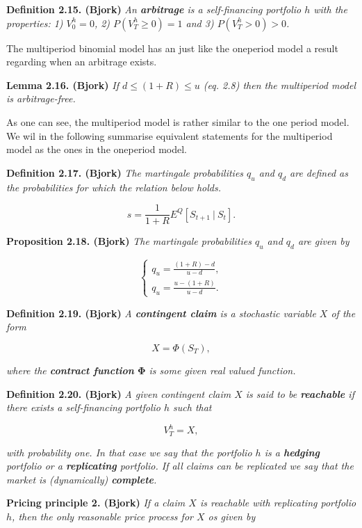 \documentclass[a4paper,12pt,openany]{book}
\begin{document}
\textbf{Definition 2.15. (Bjork)} \emph{An \textbf{arbitrage} is a self-financing portfolio \(h\) with the properties: 1) \(V^h_0=0\), 2) \(P(V^h_T\ge 0)=1\) and 3) \(P(V^h_T>0)>0\).}

The multiperiod binomial model has an just like the oneperiod model a result regarding when an arbitrage exists.

\textbf{Lemma 2.16. (Bjork)} \emph{If \(d\le (1+R)\le u\) (eq. 2.8) then the multiperiod model is arbitrage-free.}

As one can see, the multiperiod model is rather similar to the one period model. We wil in the following summarise equivalent statements for the multiperiod model as the ones in the oneperiod model.

\textbf{Definition 2.17. (Bjork)} \emph{The martingale probabilities \(q_u\) and \(q_d\) are defined as the probabilities for which the relation below holds.}

\[
s=\frac{1}{1+R}E^Q[S_{t+1}\ \vert\ S_t].
\]

\textbf{Proposition 2.18. (Bjork)} \emph{The martingale probabilities \(q_u\) and \(q_d\) are given by}

\[
\left\{\begin{matrix}q_u=\frac{(1+R)-d}{u-d},\\ q_u=\frac{u-(1+R)}{u-d}.\end{matrix}\right.
\]

\textbf{Definition 2.19. (Bjork)} \emph{A \textbf{contingent claim} is a stochastic variable \(X\) of the form}

\[
X=\Phi(S_T),
\]

\emph{where the \textbf{contract function} \(\mathbf{\Phi}\) is some given real valued function.}

\textbf{Definition 2.20. (Bjork)} \emph{A given contingent claim \(X\) is said to be \textbf{reachable} if there exists a self-financing portfolio \(h\) such that}

\[
V_T^h=X,
\]

\emph{with probability one. In that case we say that the portfolio \(h\) is a \textbf{hedging} portfolio or a \textbf{replicating} portfolio. If all claims can be replicated we say that the market is \emph{(dynamically)} \textbf{complete}.}

\textbf{Pricing principle 2. (Bjork)} \emph{If a claim \(X\) is reachable with replicating portfolio \(h\), then the only reasonable price process for \(X\) os given by}
\end{document}
